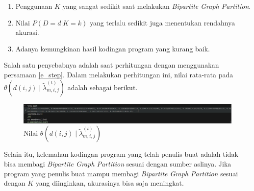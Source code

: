 \begin{enumerate}
  \item Penggunaan $K$ yang sangat sedikit saat melakukan \textit{Bipartite Graph Partition}.
  \item Nilai $P(D = d|K = k)$ yang terlalu sedikit juga menentukan rendahnya akurasi.
  \item Adanya kemungkinan hasil kodingan program yang kurang baik.
\end{enumerate}

Salah satu penyebabnya adalah saat perhitungan dengan menggunakan persamaan \ref*{e_step}. Dalam
melakukan perhitungan ini, nilai rata-rata pada $\theta \left(d(i, j) \mid \tilde{\lambda}_{m, i, j}^{(t)}\right)$
adalah sebagai berikut.

\begin{figure}[H]
  \centering
  \includegraphics[width=1\textwidth]{gambar/bab_4_image/teta_list.jpg}
  \caption{Nilai $\theta \left(d(i, j) \mid \tilde{\lambda}_{m, i, j}^{(t)}\right)$}
  \label{gambar:teta_list}
\end{figure}

Selain itu, kelemahan kodingan program yang telah penulis buat adalah tidak bisa membagi \textit{Bipartite Graph Partition}
sesuai dengan sumber aslinya. Jika program yang penulis buat mampu membagi \textit{Bipartite Graph Partition} sesuai dengan
$K$ yang diinginkan, akurasinya bisa saja meningkat.



